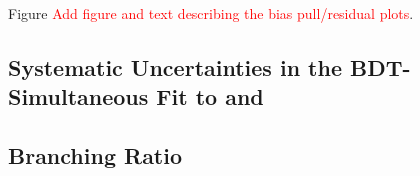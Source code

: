 Figure \textcolor{red}{Add figure and text describing the bias pull/residual plots}.

\subsection{Systematic Uncertainties in the BDT-Simultaneous Fit to \Bs and \Bd}
\label{subsec:SystUncertaintySimultaneousFit}


\subsection{Branching Ratio}
\label{subsec:BranchingRatio}
